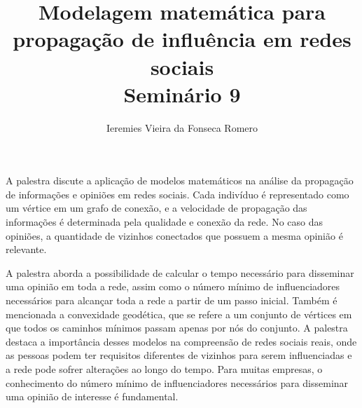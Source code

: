 \documentclass[11pt]{article}
\author{Ieremies Vieira da Fonseca Romero}
\date{}
\title{Modelagem matemática para propagação de influência em redes sociais\\\medskip
\large Seminário 9}
\begin{document}
\maketitle
A palestra discute a aplicação de modelos matemáticos na análise da propagação de informações e opiniões em redes sociais. Cada indivíduo é representado como um vértice em um grafo de conexão, e a velocidade de propagação das informações é determinada pela qualidade e conexão da rede. No caso das opiniões, a quantidade de vizinhos conectados que possuem a mesma opinião é relevante.

A palestra aborda a possibilidade de calcular o tempo necessário para disseminar uma opinião em toda a rede, assim como o número mínimo de influenciadores necessários para alcançar toda a rede a partir de um passo inicial. Também é mencionada a convexidade geodética, que se refere a um conjunto de vértices em que todos os caminhos mínimos passam apenas por nós do conjunto. A palestra destaca a importância desses modelos na compreensão de redes sociais reais, onde as pessoas podem ter requisitos diferentes de vizinhos para serem influenciadas e a rede pode sofrer alterações ao longo do tempo. Para muitas empresas, o conhecimento do número mínimo de influenciadores necessários para disseminar uma opinião de interesse é fundamental.
\end{document}
